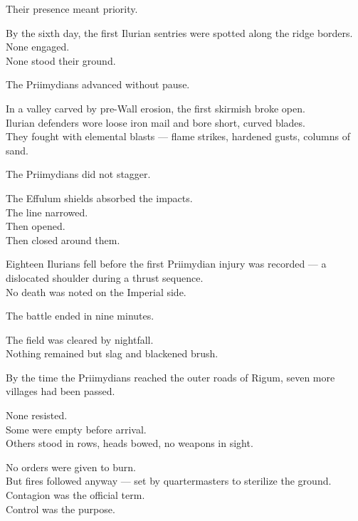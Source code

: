 \documentclass[9pt]{article}
\begin{document}
Their presence meant priority.

\vspace{1em}

By the sixth day, the first Ilurian sentries were spotted along the ridge borders.\\
None engaged.\\
None stood their ground.

The Priimydians advanced without pause.

\vspace{1em}

In a valley carved by pre-Wall erosion, the first skirmish broke open.\\
Ilurian defenders wore loose iron mail and bore short, curved blades.\\
They fought with elemental blasts — flame strikes, hardened gusts, columns of sand.

The Priimydians did not stagger.

The Effulum shields absorbed the impacts.\\
The line narrowed.\\
Then opened.\\
Then closed around them.

Eighteen Ilurians fell before the first Priimydian injury was recorded — a dislocated shoulder during a thrust sequence.\\
No death was noted on the Imperial side.

\vspace{1em}

The battle ended in nine minutes.

The field was cleared by nightfall.\\
Nothing remained but slag and blackened brush.

\vspace{1em}

By the time the Priimydians reached the outer roads of Rigum, seven more villages had been passed.

None resisted.\\
Some were empty before arrival.\\
Others stood in rows, heads bowed, no weapons in sight.

No orders were given to burn.\\
But fires followed anyway — set by quartermasters to sterilize the ground.\\
Contagion was the official term.\\
Control was the purpose.
\end{document}
